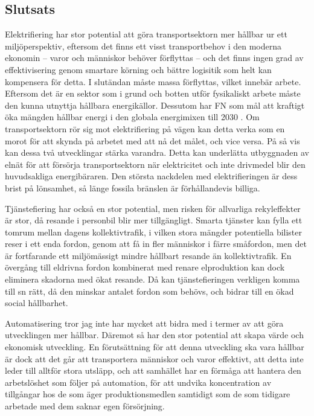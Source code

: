 \documentclass{article}
\begin{document}
\subsection{Slutsats}

Elektrifiering har stor potential att göra transportsektorn mer hållbar ur ett miljöperspektiv, eftersom det finns ett visst transportbehov i den moderna ekonomin – varor och människor behöver förflyttas – och det finns ingen grad av effektivisering genom smartare körning och bättre logisitik som helt kan kompensera för detta. I slutändan måste massa förflyttas, vilket innebär arbete. Eftersom det är en sektor som i grund och botten utför fysikaliskt arbete måste den kunna utnyttja hållbara energikällor. Dessutom har FN som mål att kraftigt öka mängden hållbar energi i den globala energimixen till 2030 . Om transportsektorn rör sig mot elektrifiering på vägen kan detta verka som en morot för att skynda på arbetet med att nå det målet, och vice versa. På så vis kan dessa två utvecklingar stärka varandra. Detta kan underlätta utbyggnaden av elnät för att försörja transportsektorn när elektricitet och inte drivmedel blir den huvudsakliga energibäraren. Den största nackdelen med elektrifieringen är dess brist på lönsamhet, så länge fossila bränslen är förhållandevis billiga.

Tjänstefiering har också en stor potential, men risken för allvarliga rekyleffekter är stor, då resande i personbil blir mer tillgängligt. Smarta tjänster kan fylla ett tomrum mellan dagens kollektivtrafik, i vilken stora mängder potentiella bilister reser i ett enda fordon, genom att få in fler människor i färre småfordon, men det är fortfarande ett miljömässigt mindre hållbart resande än kollektivtrafik. En övergång till eldrivna fordon kombinerat med renare elproduktion kan dock eliminera skadorna med ökat resande. Då kan tjänstefieringen verkligen komma till sn rätt, då den minskar antalet fordon som behövs, och bidrar till en ökad social hållbarhet.

Automatisering tror jag inte har mycket att bidra med i termer av att göra utvecklingen mer hållbar. Däremot så har den stor potential att skapa värde och ekonomisk utveckling. En förutsättning för att denna utveckling ska vara hållbar är dock att det går att transportera människor och varor effektivt, att detta inte leder till alltför stora utsläpp, och att samhället har en förmåga att hantera den arbetslöshet som följer på automation, för att undvika koncentration av tillgångar hos de som äger produktionsmedlen samtidigt som de som tidigare arbetade med dem saknar egen försörjning.
\end{document}
